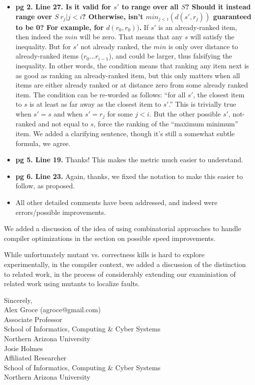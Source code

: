 \documentclass{letter}
\begin{document}
\begin{letter}{}
\begin{itemize}
\item {\bf pg 2. Line 27. Is it valid for $s'$ to range over all $S$? Should it instead range over $S \ { r_j | j < i }$? Otherwise, isn't $min_{j<i}(d(s', r_j))$ guaranteed to be 0? For example, for $d(r_0, r_0))$.}  If $s'$ is an already-ranked item, then indeed the $min$ will be zero.  That means that any $s$ will satisfy the inequality.  But for $s'$ not already ranked, the $min$ is only over distance to already-ranked items ($r_0 \ldots r_{i-1}$), and could be larger, thus falsifying the inequality.  In other words, the condition means that ranking any item next is as good as ranking an already-ranked item, but this only matters when all items are either already ranked or at distance zero from some already ranked item.  The condition can be re-worded as follows:  ``for all $s'$, the closest item to $s$ is at least as far away as the closest item to $s'$.''  This is trivially true when $s' = s$ and when $s' = r_j$ for some $j<i$.  But the other possible $s'$, not-ranked and not equal to $s$, force the ranking of the ``maximum minimum'' item.  We added a clarifying sentence, though it's still a somewhat subtle formula, we agree.
\item {\bf pg 5. Line 19.} Thanks!  This makes the metric much easier to understand.
  \item {\bf pg 6. Line 23.} Again, thanks, we fixed the notation to make this easier to follow, as proposed.
  \item All other detailed comments have been addressed, and indeed were errors/possible improvements.
  \end{itemize}


  We added a discussion of the idea of using combinatorial approaches to handle compiler optimizations in the section on possible speed improvements.

  While unfortunately mutant vs. correctness kills is hard to explore experimentally, in the compiler context, we added a discussion of the distinction to related work, in the process of considerably extending our examiniation of related work using mutants to localize faults.

  \closing{Sincerely,\\Alex Groce (agroce@gmail.com)\\Associate
    Professor\\
    School of Informatics, Computing \& Cyber Systems\\Northern
    Arizona University \vspace{0.1in}\\Josie Holmes\\Affiliated Researcher\\
    School of Informatics, Computing \& Cyber Systems\\Northern Arizona University}

\end{letter}
\end{document}
